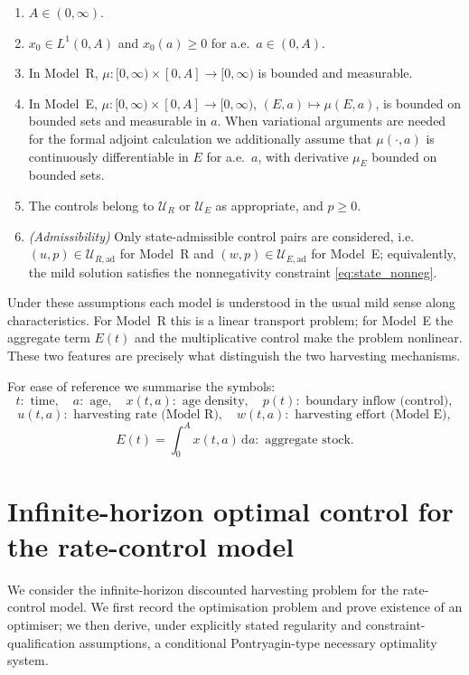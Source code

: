 \documentclass[pdflatex,sn-mathphys-num]{sn-jnl}
\theoremstyle{definition}
\theoremstyle{remark}
\newcommand{\dd}{\,\mathrm{d}}
\begin{document}
\begin{enumerate}[leftmargin=3em]
    \item[(A1)] $A\in(0,\infty)$.
    \item[(A2)] $x_0\in L^1(0,A)$ and $x_0(a)\ge0$ for a.e.\ $a\in(0,A)$.
    \item[(A3)] In Model~R, $\mu:[0,\infty)\times[0,A]\to[0,\infty)$ is
    bounded and measurable.
    \item[(A4)] In Model~E,
    $\mu:[0,\infty)\times[0,A]\to[0,\infty)$, $(E,a)\mapsto\mu(E,a)$, is
    bounded on bounded sets and measurable in $a$. When variational
    arguments are needed for the formal adjoint calculation we additionally
    assume that $\mu(\cdot,a)$ is continuously differentiable in $E$ for
    a.e.\ $a$, with derivative $\mu_E$ bounded on bounded sets.
    \item[(A5)] The controls belong to $\mathcal{U}_R$ or $\mathcal{U}_E$ as
    appropriate, and $p\ge0$.
    \item[(A6)] \emph{(Admissibility)} Only state-admissible control
    pairs are considered, i.e.\ $(u,p)\in\mathcal{U}_{R,\mathrm{ad}}$ for
    Model~R and $(w,p)\in\mathcal{U}_{E,\mathrm{ad}}$ for Model~E; equivalently,
    the mild solution satisfies the nonnegativity constraint
    \eqref{eq:state_nonneg}.
\end{enumerate}
Under these assumptions each model is understood in the usual mild sense
along characteristics. For Model~R this is a linear transport problem; for
Model~E the aggregate term $E(t)$ and the multiplicative control make the
problem nonlinear. These two features are precisely what distinguish the
two harvesting mechanisms.

For ease of reference we summarise the symbols:
\[
t:\text{ time},\quad a:\text{ age},\quad x(t,a):\text{ age density},\quad
p(t):\text{ boundary inflow (control)},
\]
\[
u(t,a):\text{ harvesting rate (Model R)},\quad
w(t,a):\text{ harvesting effort (Model E)},
\]
\[
E(t)=\int_0^A x(t,a)\dd a:\text{ aggregate stock}.
\]


\section{Infinite-horizon optimal control for the rate-control model}
\label{sec:optcontrol}

We consider the infinite-horizon discounted harvesting problem for the
rate-control model. We first record the optimisation problem and prove
existence of an optimiser; we then derive, under explicitly stated
regularity and constraint-qualification assumptions, a conditional
Pontryagin-type necessary optimality system.
\end{document}
